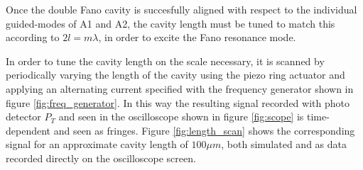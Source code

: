 Once the double Fano cavity is succesfully aligned with respect to the individual guided-modes of A1 and A2, the cavity length must be tuned to match this according to $2 l = m \lambda$, in order to excite the Fano resonance mode.

In order to tune the cavity length on the scale necessary, it is scanned by periodically varying the length of the cavity using the piezo ring actuator and applying an alternating current specified with the frequency generator shown in figure \ref{fig:freq_generator}. In this way the resulting signal recorded with photo detector $P_T$ and seen in the oscilloscope shown in figure \ref{fig:scope} is time-dependent and seen as fringes. Figure \ref{fig:length_scan} shows the corresponding signal for an approximate cavity length of $100 \mu m$, both simulated and as data recorded directly on the oscilloscope screen.

